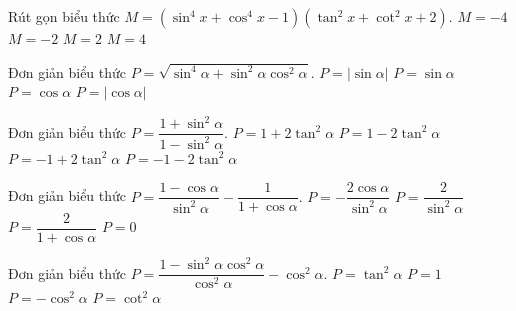 \begin{ex}%
Rút gọn biểu thức $M=\left({{\sin}^4x+{\cos}^4x-1}\right)\left({{\tan}^2x+{\cot}^2x+2}\right).$
\choice
{$M=-4$}
{$M=-2$}
{$M=2$}
{\True $M=4$}
\end{ex}

\begin{ex}%
Đơn giản biểu thức $P=\sqrt{{{\sin}^4\alpha+{\sin}^2\alpha {\cos}^2\alpha}}.$
\choice
{\True $P=\left|{\sin \alpha}\right|$}
{$P=\sin \alpha$}
{$P=\cos \alpha$}
{$P=\left|{\cos \alpha}\right|$}
\end{ex}

\begin{ex}%
Đơn giản biểu thức $P=\dfrac{{1+{\sin}^2\alpha}}{{1-{\sin}^2\alpha}}.$
\choice
{\True $P=1+2\tan ^2\alpha$}
{$P=1-2\tan ^2\alpha$}
{$P=-1+2\tan ^2\alpha$}
{$P=-1-2\tan ^2\alpha$}
 \end{ex}

\begin{ex}%
Đơn giản biểu thức $P=\dfrac{{1-\cos \alpha}}{{{\sin}^2\alpha}}-\dfrac{1}{{1+\cos \alpha}}.$
\choice
{$P=-\dfrac{{2\cos \alpha}}{{{\sin}^2\alpha}}$}
{$P=\dfrac{2}{{{\sin}^2\alpha}}$}
{$P=\dfrac{2}{{1+\cos \alpha}}$}
{\True $P=0$}
\end{ex}

\begin{ex}%
Đơn giản biểu thức $P=\dfrac{{1-{\sin}^2\alpha {\cos}^2\alpha}}{{{\cos}^2\alpha}}-\cos ^2\alpha.$
\choice
{\True $P=\tan ^2\alpha$}
{$P=1$}
{$P=-\cos ^2\alpha$}
{$P=\cot ^2\alpha$}
\end{ex}


